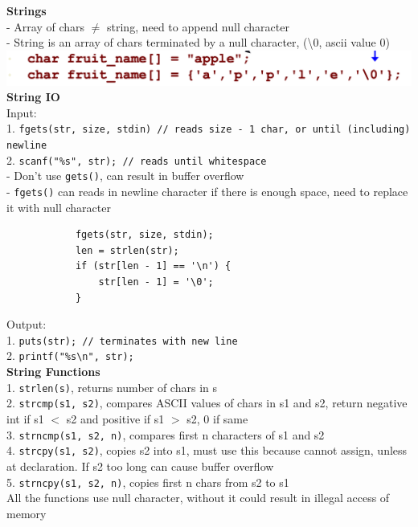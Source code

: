 \documentclass[10pt, a4paper]{article}
\begin{document}
\begin{multicols*}{3}
		\textbf{Strings}\\
		- Array of chars $\neq$ string, need to append null character\\
		- String is an array of chars terminated by a null character, (\textbackslash 0, ascii value 0)\\
		\includegraphics[scale=0.25]{./assets/stringInitialise}\\
		
		\textbf{String IO}\\
		Input:\\
		1. \texttt{fgets(str, size, stdin) // reads size - 1 char, or until (including) newline}\\
		2. \texttt{scanf("\%s", str); // reads until whitespace}\\  
		- Don't use \texttt{gets()}, can result in buffer overflow\\
		- \texttt{fgets()} can reads in newline character if there is enough space, need to replace it with null character
		\begin{verbatim}
			fgets(str, size, stdin);
			len = strlen(str);
			if (str[len - 1] == '\n') {
			    str[len - 1] = '\0';
			}
		\end{verbatim}
			
 		Output:\\
		1. \texttt{puts(str); // terminates with new line}\\
		2. \texttt{printf("\%s\textbackslash n", str); }\\
		
		\textbf{String Functions}\\
		1. \texttt{strlen(s)}, returns number of chars in s\\
		2. \texttt{strcmp(s1, s2)}, compares ASCII values of chars in s1 and s2, return negative int if s1 $<$ s2 and positive if s1 $>$ s2, 0 if same\\
		3. \texttt{strncmp(s1, s2, n)}, compares first n characters of s1 and s2\\
		4. \texttt{strcpy(s1, s2)}, copies s2 into s1, must use this because cannot assign, unless at declaration. If s2 too long can cause buffer overflow\\
		5. \texttt{strncpy(s1, s2, n)}, copies first n chars from s2 to s1\\
		All the functions use null character, without it could result in illegal access of memory\\
		

\end{multicols*}
\end{document}
